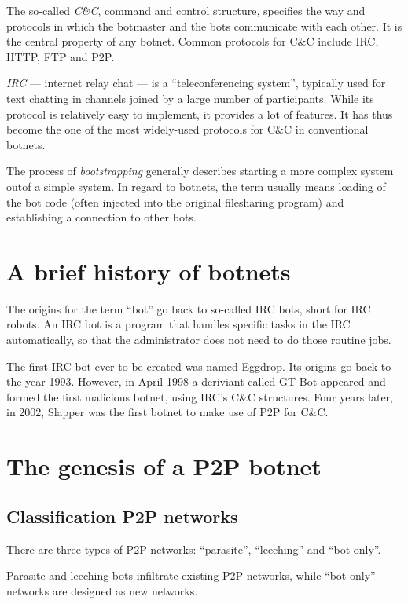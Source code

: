\documentclass{llncs}
\begin{document}
The so-called {\it C\&C}, command and control structure, specifies
the way and protocols in which the botmaster and the bots communicate
with each other. It is the central property of any botnet. Common
protocols for C\&C include IRC, HTTP, FTP and
P2P.\cite{borgaonkar2010analysis}

{\it IRC} --- internet relay chat --- is a ``teleconferencing
system''\cite{irc}, typically used for text chatting in channels
joined by a large number of participants. While its protocol is
relatively easy to implement, it provides a lot of features. It has
thus become the one of the most widely-used protocols for C\&C in
conventional botnets.

The process of {\it bootstrapping} generally describes starting a more
complex system outof a simple system. In regard to botnets, the
term usually means loading of the bot code (often injected into the
original filesharing program) and establishing a connection to other
bots.\cite{wang2009systematic}

\section{A brief history of botnets}
The origins for the term ``bot'' go back to so-called IRC bots, short
for IRC robots. An IRC bot is a program that handles specific tasks in
the IRC automatically, so that the administrator does not need to do
those routine jobs.

The first IRC bot ever to be created was named Eggdrop. Its origins go
back to the year 1993. However, in April 1998 a deriviant called
GT-Bot appeared and formed the first malicious botnet, using IRC's
C\&C structures. Four years later, in 2002, Slapper was the first
botnet to make use of P2P for C\&C.\cite{li2009botnet}

\section{The genesis of a P2P botnet}


\subsection{Classification P2P networks}
\label{ClassificP2P}
There are three types of P2P networks: ``parasite'', ``leeching'' and
``bot-only''.\cite{wang2009systematic} 

Parasite and leeching bots infiltrate existing P2P networks, while
``bot-only'' networks are designed as new networks. 
\end{document}
